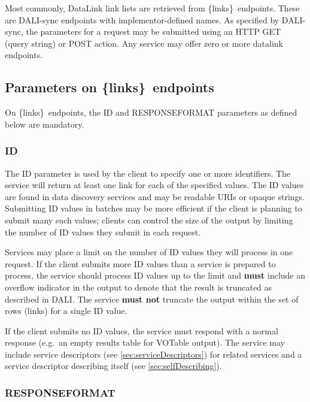 \documentclass[11pt,a4paper]{ivoa}
\newcommand{\blinks}{\{links\}}
\begin{document}
\label{sec:linksEndpoint}

Most commonly, DataLink link lists are retrieved from \blinks~endpoints.
These are DALI-sync endpoints with implementor-defined names.
As specified by DALI-sync, the parameters for a request may be submitted
using an HTTP GET (query string) or POST action.  Any service may offer
zero or more datalink endpoints.

\subsection{Parameters on \blinks~endpoints}

On \blinks~endpoints, the ID and RESPONSEFORMAT parameters as defined
below are mandatory.


\subsubsection{ID}
\label{sec:resourceId}

The ID parameter is used by the client to specify one or more
identifiers. The service will return at least one link for each of the
specified values. The ID values are found in data discovery services
and may be readable URIs or opaque strings. Submitting ID values in batches
may be more efficient if the client is planning to submit many such values;
clients can control the size of the output by limiting the number of ID values 
they submit in each request.

Services may place a limit on the number of ID values they will process in one 
request. If the client submits more ID values than a service is prepared to
process, the service should process ID values up to the limit and
{\bf must} include an overflow indicator in the output to denote that
the result is truncated as described in DALI.
The service {\bf must not} truncate the output within the set of rows
(links) for a single ID value.

If the client submits no ID values, the service must respond with a
normal response (e.g.\ an empty results table for VOTable output).
The service may include service descriptors
(see \ref{sec:serviceDescriptors})
for related services and a service descriptor describing itself
(see \ref{sec:selfDescribing}).


\subsubsection{RESPONSEFORMAT}
\label{sec:responseformat}
\end{document}
